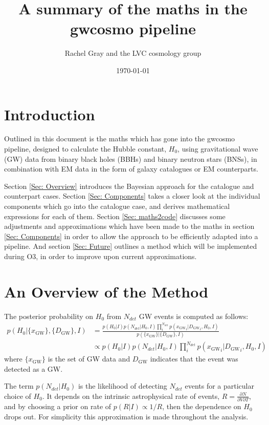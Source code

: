 \documentclass[a4paper,10pt]{article}
\title{A summary of the maths in the gwcosmo pipeline}
\author{Rachel Gray and the LVC cosmology group}
\date{\today} %
\begin{document}
\maketitle

\section{Introduction}
Outlined in this document is the maths which has gone into the gwcosmo pipeline, designed to calculate the Hubble constant, $H_0$, using gravitational wave (GW) data from binary black holes (BBHs) and binary neutron stars (BNSs), in combination with EM data in the form of galaxy catalogues or EM counterparts.

Section \ref{Sec: Overview} introduces the Bayesian approach for the catalogue and counterpart cases.  Section \ref{Sec: Components} takes a closer look at the individual components which go into the catalogue case, and derives mathematical expressions for each of them.  Section \ref{Sec: maths2code} discusses some adjustments and approximations which have been made to the maths in section \ref{Sec: Components} in order to allow the approach to be efficiently adapted into a pipeline.  And section \ref{Sec: Future} outlines a method which will be implemented during O3, in order to improve upon current approximations.


\section{An Overview of the Method \label{Sec: Overview}}


The posterior probability on $H_0$ from $N_{det}$ GW events is computed as follows:
\begin{equation}
\begin{aligned}
p(H_0|\{x_{\text{GW}}\},\{D_{\text{GW}}\},I)&=\frac{p(H_0|I)p(N_{det}|H_0,I)\prod_i^{N_{det}} p({x_{\text{GW}}}_i|{D_{\text{GW}}}_i,H_0,I)}{p(\{x_{\text{GW}}\}|\{D_{\text{GW}}\},I)}
\\ &\propto p(H_0|I)p(N_{det}|H_0,I)\prod_i^{N_{det}} p({x_{\text{GW}}}_i|{D_{\text{GW}}}_i,H_0,I)
\end{aligned}
\end{equation}
where $\{x_{\text{GW}}\}$ is the set of GW data and $D_{\text{GW}}$ indicates that the event was detected as a GW.

The term $p(N_{det}|H_0)$ is the likelihood of detecting $N_{det}$ events for a particular choice of $H_0$.  It depends on the intrinsic astrophysical rate of events, $R=\frac{\partial{N}}{\partial V \partial T}$, and by choosing a prior on rate of $p(R|I) \propto 1/R$, then the dependence on $H_0$ drops out. For simplicity this approximation is made throughout the analysis.
\end{document}
